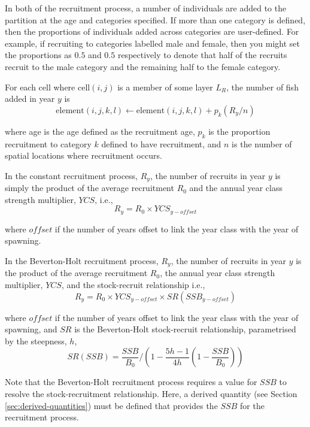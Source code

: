 In both of the recruitment process, a number of individuals are added to the partition at the age and categories specified. If more than one category is defined, then the proportions of individuals added across categories are user-defined. For example, if recruiting to categories labelled male and female, then you might set the proportions as $0.5$ and $0.5$ respectively to denote that half of the recruits recruit to the male category and the remaining half to the female category.

For each cell where cell$(i,j)$ is a member of some layer $L_R$, the  number of fish added in year $y$ is 
\begin{equation}
  \text{element}(i,j,k,l) \leftarrow \text{element}(i,j,k,l) + p_k(R_y / n)
\end{equation}

where age is the age defined as the recruitment age, $p_k$ is the proportion recruitment to category $k$ defined to have recruitment, and $n$ is the number of spatial locations where recruitment occurs. 

In the constant recruitment process, $R_y$, the number of recruits in year $y$ is simply the product of the average recruitment $R_0$ and the annual year class strength multiplier, $YCS$, i.e.,
\begin{equation}
  R_y = R_0 \times YCS_{y-offset}
\end{equation}

where $offset$ if the number of years offset to link the year class with the year of spawning.

In the Beverton-Holt recruitment process, $R_y$, the number of recruits in year $y$ is the product of the average recruitment $R_0$, the annual year class strength multiplier, $YCS$, and the stock-recruit relationship i.e.,
\begin{equation}
  R_y = R_0 \times YCS_{y-offset} \times SR(SSB_{y-offset})
\end{equation}

where $offset$ if the number of years offset to link the year class with the year of spawning, and $SR$ is the Beverton-Holt stock-recruit relationship, parametrised by the steepness, $h$,
\begin{equation}
SR(SSB) = \frac{SSB}{B_0} / \left( 1-\frac{5h-1}{4h} \left( 1-\frac{SSB}{B_0} \right) \right)
\end{equation}

Note that the Beverton-Holt recruitment process requires a value for $SSB$ to resolve the stock-recruitment relationship. Here, a derived quantity (see Section \ref{sec:derived-quantities}) must be defined that provides the $SSB$ for the recruitment process.

